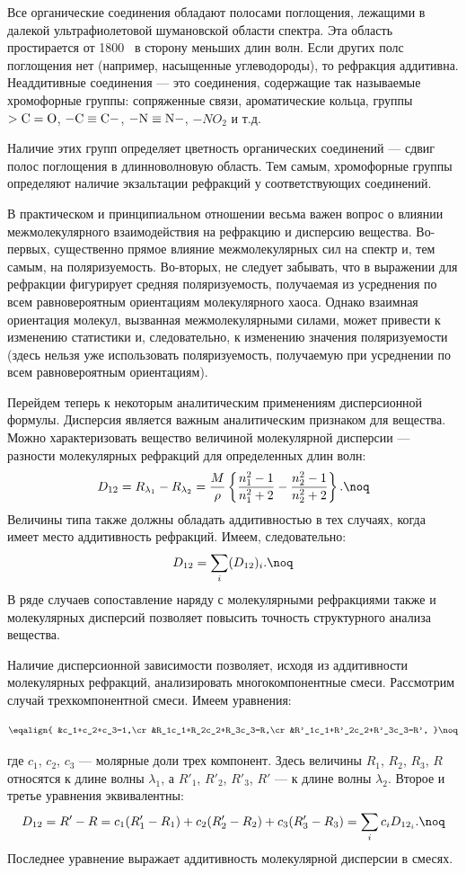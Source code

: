 Все органические соединения обладают полосами поглощения, лежащими
в далекой ультрафиолетовой шумановской области спектра. Эта
область простирается от 1800 \angst\ в сторону меньших длин волн.
Если других полс поглощения нет (например, насыщенные
углеводороды), то рефракция аддитивна. Неаддитивные соединения
--- это соединения, содержащие так называемые хромофорные группы:
сопряженные связи, ароматические кольца, группы $\rm >C=O$, $\rm
-C\equiv C-$, $\rm -N\equiv N-$, $-NO_2$ и т.д.

Наличие этих групп определяет цветность органических соединений
--- сдвиг полос поглощения в длинноволновую область. Тем самым,
хромофорные группы определяют наличие экзальтации рефракций у
соответствующих соединений.

В практическом и принципиальном отношении весьма важен вопрос о
влиянии межмолекулярного взаимодействия на рефракцию и дисперсию
вещества. Во-первых, существенно прямое влияние межмолекулярных
сил на спектр и, тем самым, на поляризуемость. Во-вторых, не
следует забывать, что в выражении для рефракции фигурирует средняя
поляризуемость, получаемая из усреднения по всем равновероятным
ориентациям молекулярного хаоса. Однако взаимная ориентация
молекул, вызванная межмолекулярными силами, может привести к
изменению статистики и, следовательно, к изменению значения
поляризуемости (здесь нельзя уже использовать поляризуемость,
получаемую при усреднении по всем равновероятным ориентациям).

 \vskip 2mm
Перейдем теперь к некоторым аналитическим применениям
дисперсионной формулы. Дисперсия является важным аналитическим
признаком для вещества. Можно характеризовать вещество величиной
молекулярной дисперсии --- разности молекулярных рефракций для
определенных длин волн:
$$D_{12}=R_{\lambda_1}-R_{\lambda_2}={M\over\rho}\left\{
{n_1^2-1\over n_1^2+2}-{n_2^2-1\over n_2^2+2}\right\}.\noq$$
Величины типа также должны обладать аддитивностью в тех случаях,
когда имеет место аддитивность рефракций. Имеем, следовательно:
$$D_{12}=\sum_i(D_{12})_i.\noq$$
В ряде случаев сопоставление наряду с молекулярными рефракциями
также и молекулярных дисперсий позволяет повысить точность
структурного анализа вещества.

Наличие дисперсионной зависимости позволяет, исходя из
аддитивности молекулярных рефракций, анализировать
многокомпонентные смеси. Рассмотрим случай трехкомпонентной смеси.
Имеем уравнения:
\begin{plain}
$$\eqalign{
&c_1+c_2+c_3=1,\cr &R_1c_1+R_2c_2+R_3c_3=R,\cr
&R'_1c_1+R'_2c_2+R'_3c_3=R', }\noq$$ 
\end{plain}
где $c_1$, $c_2$, $c_3$ ---
молярные доли трех компонент. Здесь величины $R_1$, $R_2$, $R_3$,
$R$ относятся к длине волны $\lambda_1$, а $R'_1$, $R'_2$, $R'_3$,
$R'$ --- к длине волны $\lambda_2$. Второе и третье уравнения
эквивалентны:
$$D_{12}=R'-R=c_1(R'_1-R_1)+c_2(R'_2-R_2)+c_3(R'_3-R_3)=\sum_{i}c_i
D_{12_i}.\noq$$ Последнее уравнение выражает аддитивность
молекулярной дисперсии в смесях.

